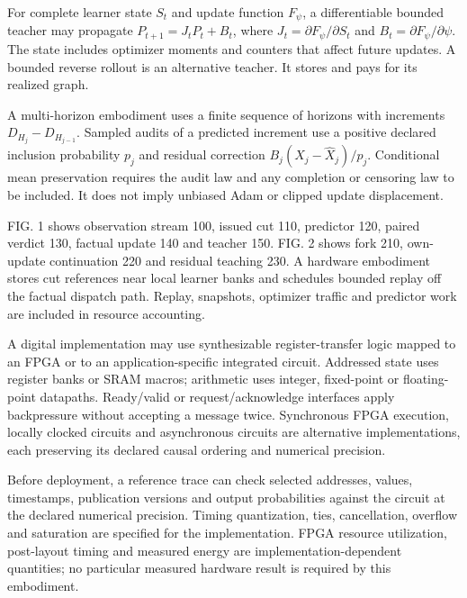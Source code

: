\documentclass[pct]{sm-patent}
\begin{document}
\pnum For complete learner state $S_t$ and update function $F_\psi$, a differentiable bounded teacher may propagate $P_{t+1}=J_tP_t+B_t$, where $J_t=\partial F_\psi/\partial S_t$ and $B_t=\partial F_\psi/\partial\psi$. The state includes optimizer moments and counters that affect future updates. A bounded reverse rollout is an alternative teacher. It stores and pays for its realized graph.

\pnum A multi-horizon embodiment uses a finite sequence of horizons with increments $D_{H_j}-D_{H_{j-1}}$. Sampled audits of a predicted increment use a positive declared inclusion probability $p_j$ and residual correction $B_j(X_j-\widehat X_j)/p_j$. Conditional mean preservation requires the audit law and any completion or censoring law to be included. It does not imply unbiased Adam or clipped update displacement.

\pnum FIG. 1 shows observation stream 100, issued cut 110, predictor 120, paired verdict 130, factual update 140 and teacher 150. FIG. 2 shows fork 210, own-update continuation 220 and residual teaching 230. A hardware embodiment stores cut references near local learner banks and schedules bounded replay off the factual dispatch path. Replay, snapshots, optimizer traffic and predictor work are included in resource accounting.


\pnum A digital implementation may use synthesizable register-transfer logic mapped to an FPGA or to an application-specific integrated circuit. Addressed state uses register banks or SRAM macros; arithmetic uses integer, fixed-point or floating-point datapaths. Ready/valid or request/acknowledge interfaces apply backpressure without accepting a message twice. Synchronous FPGA execution, locally clocked circuits and asynchronous circuits are alternative implementations, each preserving its declared causal ordering and numerical precision.

\pnum Before deployment, a reference trace can check selected addresses, values, timestamps, publication versions and output probabilities against the circuit at the declared numerical precision. Timing quantization, ties, cancellation, overflow and saturation are specified for the implementation. FPGA resource utilization, post-layout timing and measured energy are implementation-dependent quantities; no particular measured hardware result is required by this embodiment.

\claimsstart
\end{document}
